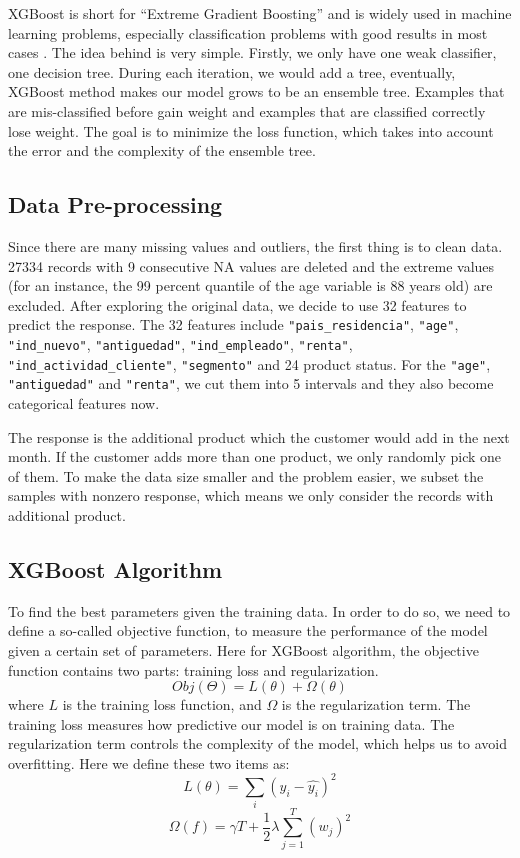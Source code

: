 \documentclass{article}
\begin{document}
\begin{spacing}{1}
\begin{large}
\noindent \indent XGBoost is short for ``Extreme Gradient Boosting” and is widely used in machine learning problems, especially classification problems with good results in most cases \cite{xg1}\cite{xg2}. The idea behind is very simple. Firstly, we only have one weak classifier, one decision tree. During each iteration, we would add a tree, eventually, XGBoost method makes our model grows to be an ensemble tree. Examples that are mis-classified before gain weight and examples that are classified correctly lose weight. The goal is to minimize the loss function, which takes into account the error and the complexity of the ensemble tree.

\subsection{Data Pre-processing}

\noindent \indent Since there are many missing values and outliers, the first thing is to clean data. 27334 records with 9 consecutive NA values are deleted and the extreme values (for an instance, the 99 percent quantile of the age variable is 88 years old) are excluded. After exploring the original data, we decide to use 32 features to predict the response. The 32 features include \verb|"pais_residencia"|, \verb|"age"|, \verb|"ind_nuevo"|, \verb|"antiguedad"|, \verb|"ind_empleado"|, \verb|"renta"|, \verb|"ind_actividad_cliente"|, \verb|"segmento"| and 24 product status. For the \verb|"age"|, \verb|"antiguedad"| and \verb|"renta"|, we cut them into 5 intervals and they also become categorical features now.

The response is the additional product which the customer would add in the next month. If the customer adds more than one product, we only randomly pick one of them. To make the data size smaller and the problem easier, we subset the samples with nonzero response, which means we only consider the records with additional product.

\subsection{XGBoost Algorithm}

\noindent \indent To find the best parameters given the training data. In order to do so, we need to define a so-called objective function, to measure the performance of the model given a certain set of parameters. Here for XGBoost algorithm, the objective function contains two parts: training loss and regularization.
\[
Obj(\Theta) = L(\theta) + \Omega(\theta)
\]
where $L$ is the training loss function, and $\Omega$ is the regularization term. The training loss measures how predictive our model is on training data. The regularization term controls the complexity of the model, which helps us to avoid overfitting. Here we define these two items as:
\[
L(\theta) = \sum_{i}(y_i - \hat{y_i})^2
\]
\[
\Omega(f) = \gamma T + \frac{1}{2}\lambda\sum_{j = 1}^{T}(w_j)^2
\]





\end{large}
\end{spacing}
\end{document}
